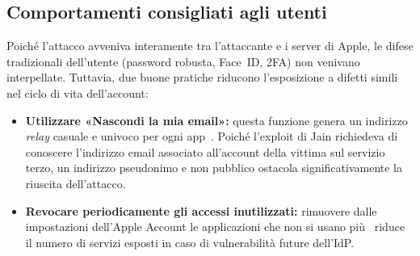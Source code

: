 \subsection{Comportamenti consigliati agli utenti}
Poiché l'attacco avveniva interamente tra l'attaccante e i server di Apple, le difese tradizionali dell'utente (password robusta, Face~ID, 2FA) non venivano interpellate. Tuttavia, due buone pratiche riducono l'esposizione a difetti simili nel ciclo di vita dell'account:
\begin{itemize}
    \item \textbf{Utilizzare «Nascondi la mia email»:} questa funzione genera un indirizzo \emph{relay} casuale e univoco per ogni app~\cite{apple-hide-my-email}. Poiché l'exploit di Jain richiedeva di conoscere l'indirizzo email associato all'account della vittima sul servizio terzo, un indirizzo pseudonimo e non pubblico ostacola significativamente la riuscita dell'attacco.
    \item \textbf{Revocare periodicamente gli accessi inutilizzati:} rimuovere dalle impostazioni dell'Apple Account le applicazioni che non si usano più~\cite{apple-manage-apps} riduce il numero di servizi esposti in caso di vulnerabilità future dell'IdP.
\end{itemize}
